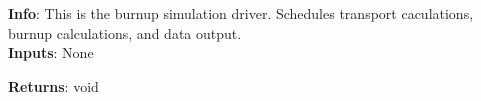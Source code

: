 \textbf{Info}: This is the burnup simulation driver. Schedules transport
caculations, burnup calculations, and data output. \\

\noindent \textbf{Inputs}: None

\noindent \textbf{Returns}: void
